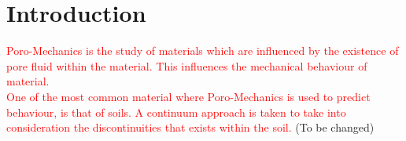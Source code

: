 \chapter{Introduction}
\textcolor{red}{Poro-Mechanics is the study of materials which are influenced by the existence of pore fluid within the material. This influences the mechanical behaviour of material.\\ 
One of the most common material where Poro-Mechanics is used to predict behaviour, is that of soils. A continuum approach is taken to take into consideration the discontinuities that exists within the soil.} (To be changed)
